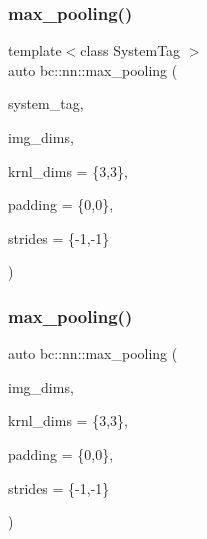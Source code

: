 \mbox{\label{namespacebc_1_1nn_a03cb186fd7f64df5668d4c6ada3047c7}} 
\subsubsection{\texorpdfstring{max\+\_\+pooling()}{max\_pooling()}\hspace{0.1cm}{\footnotesize\ttfamily [2/3]}}
{\footnotesize\ttfamily template$<$class System\+Tag $>$ \\
auto bc\+::nn\+::max\+\_\+pooling (\begin{DoxyParamCaption}\item[{System\+Tag}]{system\+\_\+tag,  }\item[{\hyperlink{structbc_1_1Dim}{Dim}$<$ 3 $>$}]{img\+\_\+dims,  }\item[{\hyperlink{structbc_1_1Dim}{Dim}$<$ 2 $>$}]{krnl\+\_\+dims = {\ttfamily \{3,3\}},  }\item[{\hyperlink{structbc_1_1Dim}{Dim}$<$ 2 $>$}]{padding = {\ttfamily \{0,0\}},  }\item[{\hyperlink{structbc_1_1Dim}{Dim}$<$ 2 $>$}]{strides = {\ttfamily \{-\/1,-\/1\}} }\end{DoxyParamCaption})}

\mbox{\label{namespacebc_1_1nn_ad265b01898441246ba30799156b0158b}} 
\subsubsection{\texorpdfstring{max\+\_\+pooling()}{max\_pooling()}\hspace{0.1cm}{\footnotesize\ttfamily [3/3]}}
{\footnotesize\ttfamily auto bc\+::nn\+::max\+\_\+pooling (\begin{DoxyParamCaption}\item[{\hyperlink{structbc_1_1Dim}{Dim}$<$ 3 $>$}]{img\+\_\+dims,  }\item[{\hyperlink{structbc_1_1Dim}{Dim}$<$ 2 $>$}]{krnl\+\_\+dims = {\ttfamily \{3,3\}},  }\item[{\hyperlink{structbc_1_1Dim}{Dim}$<$ 2 $>$}]{padding = {\ttfamily \{0,0\}},  }\item[{\hyperlink{structbc_1_1Dim}{Dim}$<$ 2 $>$}]{strides = {\ttfamily \{-\/1,-\/1\}} }\end{DoxyParamCaption})}

